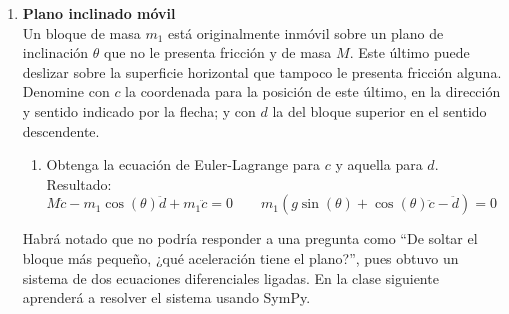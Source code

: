 \documentclass[11pt, a4paper, twoside]{article}
\begin{document}
\begin{enumerate}
\item
	\begin{minipage}[t][4.5cm]{0.7\textwidth}
		\textbf{Plano inclinado móvil}\\
		Un bloque de masa \(m_1\) está originalmente inmóvil sobre un plano de inclinación \(\theta\) que no le presenta fricción y de masa \(M\).
		Este último puede deslizar sobre la superficie horizontal que tampoco le presenta fricción alguna.
		Denomine con \(c\) la coordenada para la posición de este último, en la dirección y sentido indicado por la flecha; y con \(d\) la del bloque superior en el sentido descendente.
		\begin{enumerate}
			\item Obtenga la ecuación de Euler-Lagrange para \(c\) y aquella para \(d\).\\ 
			Resultado:
	\(
		M \ddot{c} - m_1 \cos{\left(\theta \right)} \ddot{d} + m_1 \ddot{c} = 0
		\qquad
		m_1 \left(g \sin{\left(\theta \right)} + \cos{\left(\theta \right)} \ddot{c} - \ddot{d }\right) = 0
	\)
		\end{enumerate}
	\end{minipage}
	\begin{minipage}[c][0cm][t]{0.3\textwidth}
		
	\end{minipage}
	Habrá notado que no podría responder a una pregunta como ``De soltar el bloque más pequeño, ¿qué aceleración tiene el plano?'', pues obtuvo un sistema de dos ecuaciones diferenciales ligadas.
	En la clase siguiente aprenderá a resolver el sistema usando SymPy.
	




\end{enumerate}
\end{document}
